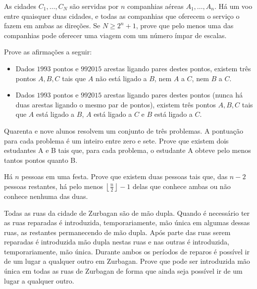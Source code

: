 \begin{questao}
  As cidades $C_1,\ldots,C_N$ são servidas por $n$
  companhias aéreas $A_1,\ldots,A_n$. Há um voo entre quaisquer duas
  cidades, e todas as companhias que oferecem o serviço o fazem em
  ambas as direções. Se $N \geq 2^n+1$, prove que pelo menos uma das
  companhias pode oferecer uma viagem com um número ímpar de escalas.
\end{questao}

\begin{questao}
  Prove as afirmações a seguir:

  \begin{itemize}
    \item Dados $1993$ pontos e $992015$ arestas ligando pares
    destes pontos, existem três pontos $A,B,C$ tais que $A$ não
    está ligado a $B$, nem $A$ a $C$, nem $B$ a $C$.

    \item Dados $1993$ pontos e $992015$ arestas ligando pares
    destes pontos (nunca há duas arestas ligando o mesmo par de
    pontos), existem três pontos $A,B,C$ tais que $A$ está ligado
    a $B$, $A$ está ligado a $C$ e $B$ está ligado a $C$.
  \end{itemize}
\end{questao}

\begin{questao}
  Quarenta e nove alunos resolvem um conjunto de três
  problemas. A pontuação para cada problema é um inteiro entre zero e
  sete. Prove que existem dois estudantes A e B tais que, para cada
  problema, o estudante A obteve pelo menos tantos pontos quanto B.
\end{questao}

\begin{questao}
  Há $n$ pessoas em uma festa. Prove que existem duas
  pessoas tais que, das $n-2$ pessoas restantes, há pelo menos
  $\left \lfloor \frac{n}{2} \right \rfloor - 1$ delas que conhece
  ambas ou não conhece nenhuma das duas.
\end{questao}

\begin{questao}
  Todas as ruas da cidade de Zurbagan são de mão
  dupla. Quando é necessário ter as ruas reparadas é introduzida,
  temporariamente, mão única em algumas dessas ruas, as restantes
  permanecendo de mão dupla. Após parte das ruas serem reparadas é
  introduzida mão dupla nestas ruas e nas outras é introduzida,
  temporariamente, mão única. Durante ambos os períodos de reparos é
  possível ir de um lugar a qualquer outro em Zurbagan. Prove que pode
  ser introduzida mão única em todas as ruas de Zurbagan de forma que
  ainda seja possível ir de um lugar a qualquer outro.
\end{questao}

